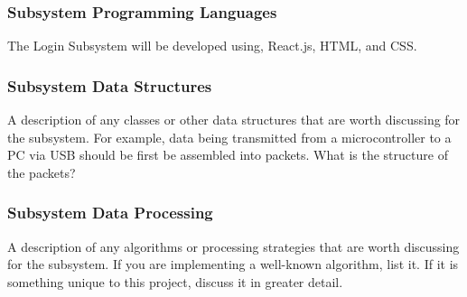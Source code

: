 \subsubsection{Subsystem Programming Languages}
The Login Subsystem will be developed using, React.js, HTML, and CSS.

\subsubsection{Subsystem Data Structures}
A description of any classes or other data structures that are worth discussing for the subsystem. For example, data being transmitted from a microcontroller to a PC via USB should be first be assembled into packets. What is the structure of the packets?

\subsubsection{Subsystem Data Processing}
A description of any algorithms or processing strategies that are worth discussing for the subsystem. If you are implementing a well-known algorithm, list it. If it is something unique to this project, discuss it in greater detail.


